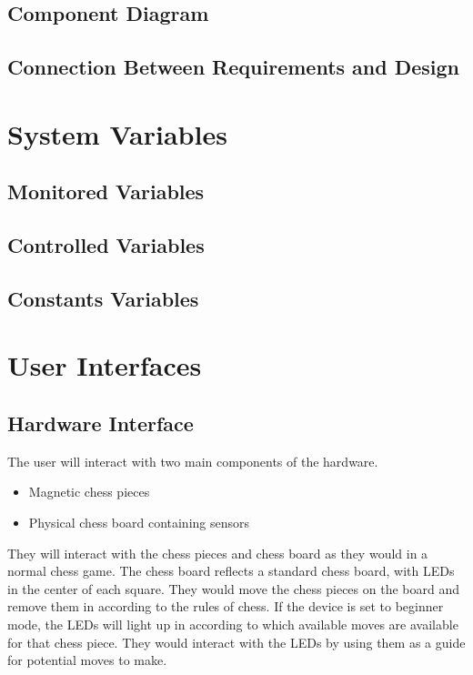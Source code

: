 \documentclass[12pt, titlepage]{article}
\begin{document}

\subsection{Component Diagram}

\subsection{Connection Between Requirements and Design} \label{SecConnection}


\section{System Variables}


\subsection{Monitored Variables}

\subsection{Controlled Variables}

\subsection{Constants Variables}

\section{User Interfaces}

\subsection*{Hardware Interface}
The user will interact with two main components of the hardware.
\begin{itemize}
  \item Magnetic chess pieces
  \item Physical chess board containing sensors
\end{itemize}
They will interact with the chess pieces and chess board as they would in a normal chess game. The chess board reflects a standard chess board, with 
LEDs in the center of each square. They would move the chess pieces on the board and remove them in according to the rules of chess. If the device
is set to beginner mode, the LEDs will light up in according to which available moves are available for that chess piece. They would interact with the LEDs
by using them as a guide for potential moves to make.
\end{document}
